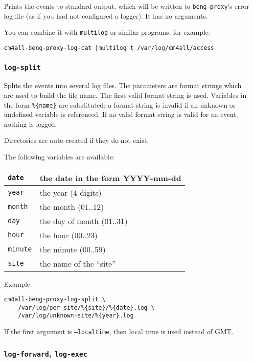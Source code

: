 \documentclass[a4paper,12pt]{article}
\begin{document}
Prints the events to standard output, which will be written to
\texttt{beng-proxy}'s error log file (as if you had not configured a
logger).  It has no arguments.

You can combine it with \texttt{multilog} or similar programs, for
example:

\begin{verbatim}
cm4all-beng-proxy-log-cat |multilog t /var/log/cm4all/access
\end{verbatim}

\subsubsection{\texttt{log-split}}

Splits the events into several log files.  The parameters are format
strings which are used to build the file name.  The first valid format
string is used.  Variables in the form \texttt{\%\{name\}} are
substituted; a format string is invalid if an unknown or undefined
variable is referenced.  If no valid format string is valid for an
event, nothing is logged.

Directories are auto-created if they do not exist.

The following variables are available:

\begin{tabular}{|l|p{8cm}|}
\hline
\texttt{date} & the date in the form YYYY-mm-dd \\
\hline
\texttt{year} & the year (4 digits) \\
\hline
\texttt{month} & the month (01..12) \\
\hline
\texttt{day} & the day of month (01..31) \\
\hline
\texttt{hour} & the hour (00..23) \\
\hline
\texttt{minute} & the minute (00..59) \\
\hline
\texttt{site} & the name of the ``site'' \\
\hline
\end{tabular}

Example:

\begin{verbatim}
cm4all-beng-proxy-log-split \
    /var/log/per-site/%{site}/%{date}.log \
    /var/log/unknown-site/%{year}.log
\end{verbatim}

If the first argument is \texttt{--localtime}, then local time is used
instead of GMT.

\subsubsection{\texttt{log-forward}, \texttt{log-exec}}
\end{document}
